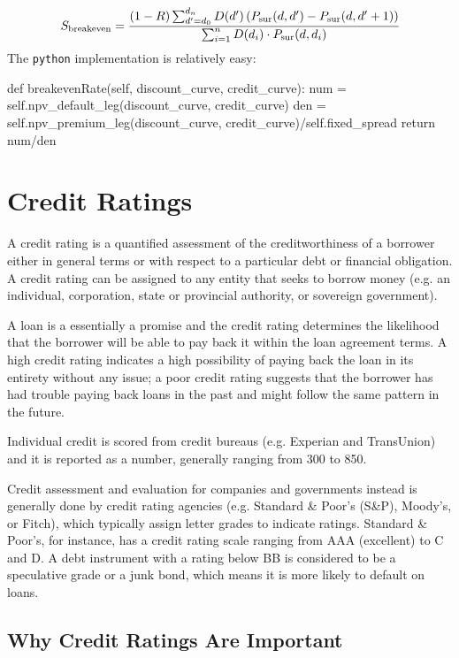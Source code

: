 \begin{equation}
S_{\mathrm{breakeven}} = \cfrac{(1-R) \sum_{d'=d_0}^{d_n} D(d') \left( P_{\textrm{sur}}(d, d') - P_{\textrm{sur}}(d, d'+1) \right)}{\sum_{i=1}^{n} D(d_i) \cdot P_{\textrm{sur}}(d, d_i)}
\end{equation}
The \texttt{python} implementation is relatively easy:

\begin{ipython}
def breakevenRate(self, discount_curve, credit_curve):
    num = self.npv_default_leg(discount_curve, credit_curve)
    den = self.npv_premium_leg(discount_curve, credit_curve)/self.fixed_spread
    return num/den
\end{ipython}

\section{Credit Ratings}\label{credit-ratings}

A credit rating is a quantified assessment of the creditworthiness of a borrower either in general terms or with respect to a particular debt or financial obligation. A credit rating can be assigned to any entity that seeks to borrow money (e.g. an individual, corporation, state or provincial authority, or sovereign government).

A loan is a essentially a promise and the credit rating determines the likelihood that the borrower will be able to pay back it within the loan agreement terms. A high credit rating indicates a high possibility of paying back the loan in its entirety without any issue; a poor credit rating suggests that the borrower has had trouble paying back loans in the past and might follow the same pattern in the future.

Individual credit is scored from credit bureaus (e.g. Experian and TransUnion) and it is reported as a number, generally ranging from 300 to 850.

Credit assessment and evaluation for companies and governments instead is generally done by credit rating agencies (e.g. Standard \& Poor's (S\&P), Moody's, or Fitch), which typically assign letter grades to indicate ratings. Standard \& Poor's, for instance, has a credit rating scale ranging from AAA (excellent) to C and D. A debt instrument with a rating below BB is considered to be a speculative grade or a junk bond, which means it is more likely to default on loans.

\subsection{Why Credit Ratings Are Important}\label{why-credit-ratings-are-important}


